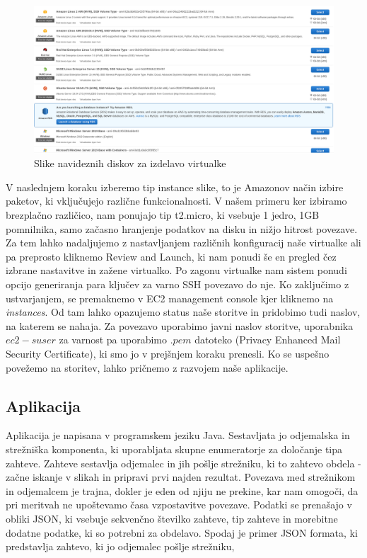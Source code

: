 \begin{figure}[H]
    \centering
    \includegraphics[scale=0.25]{Img/1_AWS_images.png}
    \caption{Slike navideznih diskov za izdelavo virtualke}
    \label{fig:1_AWS_images}
\end{figure}

V naslednjem koraku izberemo tip instance slike, to je Amazonov način izbire paketov, ki vključujejo različne funkcionalnosti. V našem primeru ker izbiramo brezplačno različico, nam ponujajo tip t2.micro, ki vsebuje 1 jedro, 1GB pomnilnika, samo začasno hranjenje podatkov na disku in nižjo hitrost povezave. Za tem lahko nadaljujemo z nastavljanjem različnih konfiguracij naše virtualke ali pa preprosto kliknemo Review and Launch, ki nam ponudi še en pregled čez izbrane nastavitve in zažene virtualko. Po zagonu virtualke nam sistem ponudi opcijo generiranja para ključev za varno SSH povezavo do nje. Ko zaključimo z ustvarjanjem, se premaknemo v EC2 management console kjer kliknemo na \emph{instances}. Od tam lahko opazujemo status naše storitve in pridobimo tudi naslov, na katerem se nahaja. Za povezavo uporabimo javni naslov storitve, uporabnika $ec2-suser$ za varnost pa uporabimo $.pem$ datoteko (Privacy Enhanced Mail Security Certificate), ki smo jo v prejšnjem koraku prenesli. Ko se uspešno povežemo na storitev, lahko pričnemo z razvojem naše aplikacije.

\subsection{Aplikacija}

Aplikacija je napisana v programskem jeziku Java. Sestavljata jo odjemalska in strežniška komponenta, ki uporabljata skupne enumeratorje za določanje tipa zahteve. Zahteve sestavlja odjemalec in jih pošlje strežniku, ki to zahtevo obdela - začne iskanje v slikah in pripravi prvi najden rezultat. Povezava med strežnikom in odjemalcem je trajna, dokler je eden od njiju ne prekine, kar nam omogoči, da pri meritvah ne upoštevamo časa vzpostavitve povezave. Podatki se prenašajo v obliki JSON, ki vsebuje sekvenčno številko zahteve, tip zahteve in morebitne dodatne podatke, ki so potrebni za obdelavo. Spodaj je primer JSON formata, ki predstavlja zahtevo, ki jo odjemalec pošlje strežniku, 

